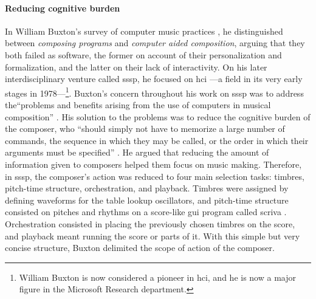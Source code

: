 	\paragraph{Reducing cognitive burden}
	In William Buxton's survey of computer music practices \parencites{Bux77:Aco}{icmc/bbp2372.1978.012}{DBLP:conf/icmc/BuxtonPRB80}, he distinguished between \textit{composing programs} and \textit{computer aided composition}, arguing that they both failed as software, the former on account of their personalization and formalization, and the latter on their lack of interactivity. On his later interdisciplinary venture called \gls{sssp}, he focused on \gls{hci} ---a field in its very early stages in 1978---\footnote{William Buxton is now considered a pioneer in \gls{hci}, and he is now a major figure in the Microsoft Research department.}. Buxton's concern throughout his work on \gls{sssp} was to address the``problems and benefits arising from the use of computers in musical composition'' \parencite[472]{DBLP:conf/icmc/BuxtonFBRSCM78}. His solution to the problems was to reduce the cognitive burden of the composer, who ``should simply not have to memorize a large number of commands, the sequence in which they may be called, or the order in which their arguments must be specified'' \parencite[474]{DBLP:conf/icmc/BuxtonFBRSCM78}. He argued that reducing the amount of information given to composers helped them focus on music making. Therefore, in \gls{sssp}, the composer's action was reduced to four main selection tasks: timbres, pitch-time structure, orchestration, and playback. Timbres were assigned by defining waveforms for the table lookup oscillators, and pitch-time structure consisted on pitches and rhythms on a score-like \gls{gui} program called \gls{scriva} \parencite{youtube/buxton10}. Orchestration consisted in placing the previously chosen timbres on the score, and playback meant running the score or parts of it. With this simple but very concise structure, Buxton delimited the scope of action of the composer.

